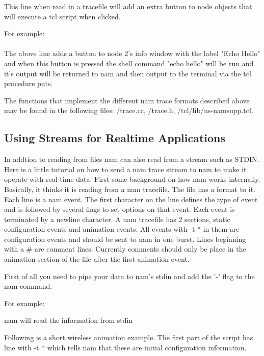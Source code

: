 This line when read in a tracefile will add an extra button to node objects that
will execute a tcl script when clicked.

For example:\\
\\

The above line adds a button to node 2's info window with the label 
"Echo Hello" and when this button is pressed the shell command 
"echo hello" will be run and it's output will be returned to nam and
then output to the terminal via the tcl procedure puts.


The functions that implement the different nam trace formats described
above may be found in the following files: \ns/trace.cc, 
\ns/trace.h, \ns/tcl/lib/ns-namsupp.tcl.


\subsection{Using Streams for Realtime Applications}

In addtion to reading from files nam can also read from a stream such as
STDIN. Here is a little tutorial on how to send a nam trace stream to nam to
make it operate with real-time data.  First some
background on how nam works internally.  Basically, it thinks it is
reading from a nam tracefile.  The file has a format to it.  Each line
is a nam event.  The first character on the line defines the type of
event and is followed by several flags to set options on that event.
Each event is terminated by a newline character.  A nam tracefile has 2
sections, static configuration events and animation events.  All events
with -t * in them are configuration events and should be sent to nam in
one burst.  Lines beginning with a \# are comment lines.  Currently
comments should only be place in the animation section of the file after
the first animation event.

First of all you need to pipe your data to nam's stdin and add the '-'
flag to the nam command.

For example:

\begin{program}
\end{program}

nam will read the information from stdin

Following is a short wireless animation example.  The first part of the
script has line with -t * which tells nam that these are initial
configuration information.

